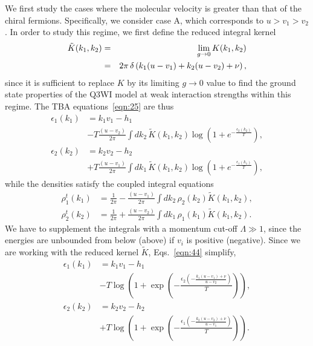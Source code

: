 \documentclass[aps,pra,
superscriptaddress,
reprint,twocolumn,preprintnumbers,
amsmath,amssymb,
nofootinbib]{revtex4-1}
\begin{document}
We first study the cases where the molecular velocity is greater than that of the chiral fermions. Specifically, we consider case A, which corresponds to $u>v_1>v_2$. In order to study this regime, we first define the reduced integral kernel
    \begin{eqnarray}
    \label{reducedK}
	\tilde{K}(k_1,k_2) &=& \lim_{g \rightarrow 0} K(k_1,k_2) \cr &=& 2\pi\,\delta\left(k_1(u - v_1) + k_2(u - v_2) + \nu \right),
	\end{eqnarray} 
since it is sufficient to replace $K$ by its limiting $g \rightarrow 0$ value to find the ground state properties of the Q3WI model at weak interaction strengths within this regime. The TBA equations~\eqref{eqn:25} are thus
     	\begin{align}
		\label{eqn:44}
		\epsilon_1(k_1) & =  k_1 v_1 - h_1 \nonumber \\ 
		&- T \frac{(u - v_2)}{2\pi} \int d k_2\,\tilde{K}(k_1, k_2) \log(1 + e^{-\frac{\epsilon_2(k_2)}{T}}), \nonumber \\
		\epsilon_2(k_2) & =  k_2 v_2 - h_2 \nonumber \\ 
		&+ T \frac{(u - v_1)}{2\pi} \int d k_1\,\tilde{K}(k_1, k_2) \log(1 + e^{-\frac{\epsilon_1(k_1)}{T}}),
		\end{align}
while the densities satisfy the coupled integral equations
       	\begin{align}
		\label{eqn:45}
		\rho^t_1(k_1) & =  \frac{1}{2\pi} - \frac{(u - v_1)}{2\pi}\int dk_2 \,\rho_2(k_2)\tilde{K}(k_1, k_2), \nonumber \\
		\rho^t_2(k_2) & =  \frac{1}{2\pi} + \frac{(u - v_2)}{2\pi}\int dk_1 \,\rho_1(k_1)\tilde{K}(k_1, k_2).
		\end{align} 
We have to supplement the integrals with a momentum cut-off $\Lambda \gg 1$, since the energies are unbounded from below (above) if $v_i$ is positive (negative). Since we are working with the reduced kernel $\tilde{K}$, Eqs.~\eqref{eqn:44} simplify,
        \begin{align}  
        \epsilon_1(k_1) &= k_1 v_1 - h_1 \nonumber \\
        &- T \log\left(1 + \exp\left( -\frac{ \epsilon_2\left(-\frac{k_1 (u - v_1) + \nu}{u - v_2}\right)}{T} \right)\right), \nonumber \\
        \epsilon_2(k_2) &= k_2 v_2 - h_2 \nonumber \\
        &+ T \log\left(1 + \exp\left( -\frac{ \epsilon_1\left(-\frac{k_2 (u - v_2) + \nu}{u - v_1}\right)}{T} \right)\right).
        \end{align}
\end{document}
